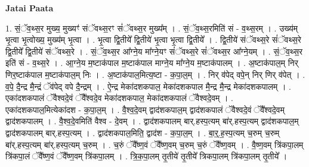 \documentclass[17pt]{extarticle}
\begin{document}
\textbf{Jatai Paata} \newline

1. सं॒ॅव॒थ्स॒र मुख्य॒ मुख्यꣳ॑ संॅवथ्स॒रꣳ सं॑ॅवथ्स॒र मुख्य᳚म् । . सं॒ॅव॒थ्स॒रमिति॑ सं - व॒थ्स॒रम् । . उख्य॑म् भृ॒त्वा भृ॒त्वोख्य॒ मुख्य॑म् भृ॒त्वा । . भृ॒त्वा द्वि॒तीये᳚ द्वि॒तीये॑ भृ॒त्वा भृ॒त्वा द्वि॒तीये᳚ । . द्वि॒तीये॑ संॅवथ्स॒रे सं॑ॅवथ्स॒रे द्वि॒तीये᳚ द्वि॒तीये॑ संॅवथ्स॒रे । . सं॒ॅव॒थ्स॒र आ᳚ग्ने॒य मा᳚ग्ने॒यꣳ सं॑ॅवथ्स॒रे सं॑ॅवथ्स॒र आ᳚ग्ने॒यम् । . सं॒ॅव॒थ्स॒र इति॑ सं - व॒थ्स॒रे । . आ॒ग्ने॒य म॒ष्टाक॑पाल म॒ष्टाक॑पाल माग्ने॒य मा᳚ग्ने॒य म॒ष्टाक॑पालम् । . अ॒ष्टाक॑पाल॒म् निर् णिर॒ष्टाक॑पाल म॒ष्टाक॑पाल॒म् निः । . अ॒ष्टाक॑पाल॒मित्य॒ष्टा - क॒पा॒ल॒म् । . निर् व॑पेद् वपे॒न् निर् णिर् व॑पेत् । . व॒पे॒ दै॒न्द्र मै॒न्द्रं ॅव॑पेद् वपे दै॒न्द्रम् । . ऐ॒न्द्र मेका॑दशकपाल॒ मेका॑दशकपाल मै॒न्द्र मै॒न्द्र मेका॑दशकपालम् । . एका॑दशकपालं ॅवैश्वदे॒वं ॅवै᳚श्वदे॒व मेका॑दशकपाल॒ मेका॑दशकपालं ॅवैश्वदे॒वम् । . एका॑दशकपाल॒मित्येका॑दश - क॒पा॒ल॒म् । . वै॒श्व॒दे॒वम् द्वाद॑शकपाल॒म् द्वाद॑शकपालं ॅवैश्वदे॒वं ॅवै᳚श्वदे॒वम् द्वाद॑शकपालम् । . वै॒श्व॒दे॒वमिति॑ वैश्व - दे॒वम् । . द्वाद॑शकपालम् बार्.हस्प॒त्यम् बा॑र्.हस्प॒त्यम् द्वाद॑शकपाल॒म् द्वाद॑शकपालम् बार्.हस्प॒त्यम् । . द्वाद॑शकपाल॒मिति॒ द्वाद॑श - क॒पा॒ल॒म् । . बा॒र्॒.ह॒स्प॒त्यम् च॒रुम् च॒रुम् बा॑र्.हस्प॒त्यम् बा॑र्.हस्प॒त्यम् च॒रुम् । . च॒रुं ॅवै᳚ष्ण॒वं ॅवै᳚ष्ण॒वम् च॒रुम् च॒रुं ॅवै᳚ष्ण॒वम् । . वै॒ष्ण॒वम् त्रि॑कपा॒लम् त्रि॑कपा॒लं ॅवै᳚ष्ण॒वं ॅवै᳚ष्ण॒वम् त्रि॑कपा॒लम् । . त्रि॒क॒पा॒लम् तृ॒तीये॑ तृ॒तीये᳚ त्रिकपा॒लम् त्रि॑कपा॒लम् तृ॒तीये᳚ । \newline
\end{document}
